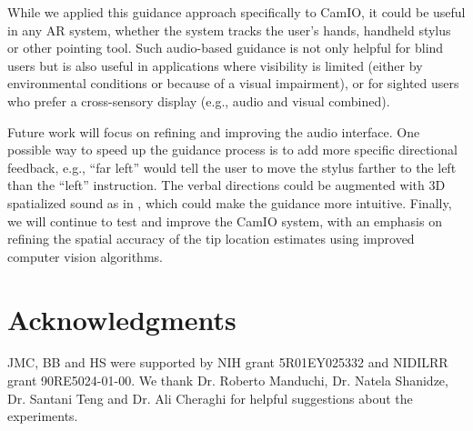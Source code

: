 \documentclass[runningheads]{res/templates/llncs}
\begin{document}
While we applied this guidance approach specifically to CamIO, it could be useful in any AR system, whether the system tracks the user's hands, handheld stylus or other pointing tool. 
Such audio-based guidance is not only helpful for blind users but is also useful in applications where visibility is limited (either by environmental conditions or because of a visual impairment), or for sighted users who prefer a cross-sensory display (e.g., audio and visual combined).

Future work will focus on refining and improving the audio interface.
One possible way to speed up the guidance process is to add more specific directional feedback, e.g., ``far left'' would tell the user to move the stylus farther to the left than the ``left'' instruction. 
The verbal directions could be augmented with 3D spatialized sound as in \cite{mayAuditoryDisplaysFacilitate2019}, which could make the guidance more intuitive. 
Finally, we will continue to test and improve the CamIO system, with an emphasis on refining the spatial accuracy of the tip location estimates using improved computer vision algorithms.

\section{Acknowledgments}
JMC, BB and HS were supported by NIH grant 5R01EY025332 and NIDILRR grant 90RE5024-01-00. We thank Dr. Roberto Manduchi, Dr. Natela Shanidze, Dr. Santani Teng and Dr. Ali Cheraghi for helpful suggestions about the experiments.




\end{document}
